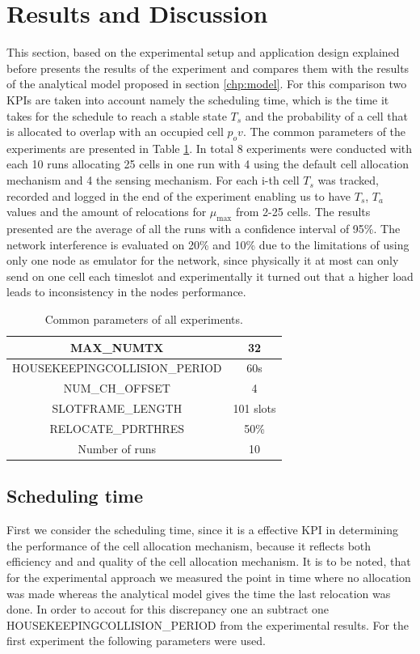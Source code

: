 \documentclass{comnets-thesis}
\begin{document}
\section{ Results and Discussion }
This section, based on the experimental setup and application design explained before presents the results of the experiment and compares them with the results of the analytical model proposed in section \ref{chp:model}. For this comparison two \acp{KPI} are taken into account namely the scheduling time, which is the time it takes for the schedule to reach a stable state $T_s$ and the probability of a cell that is allocated to overlap with an occupied cell $p_ov$. The common parameters of the experiments are presented in Table \ref{tab:common-para-ex}. In total 8 experiments were conducted with each 10 runs allocating 25 cells in one run with 4 using the default cell allocation mechanism and 4 the sensing mechanism. For each i-th cell $T_s$ was tracked, recorded and logged in the end of the experiment enabling us to have $T_s$, $T_a$ values and the amount of relocations for $\mu_{\max}$ from 2-25 cells. The results presented are the average of all the runs with a confidence interval of 95\%. 
The network interference is evaluated on 20\% and 10\% due to the limitations of using only one node as emulator for the network, since physically it at most can only send on one cell each timeslot and experimentally it turned out that a higher load leads to inconsistency in the nodes performance. 

\begin{table}[h]
    \centering
    \caption{Common parameters of all experiments.}
    \begin{tabular}{|c|c|}
    \hline
    MAX\_NUMTX & 32 \\ \hline
    HOUSEKEEPINGCOLLISION\_PERIOD & 60s  \\ \hline
    NUM\_CH\_OFFSET & 4 \\ \hline
    SLOTFRAME\_LENGTH & 101 slots  \\ \hline
    RELOCATE\_PDRTHRES & 50\%  \\ \hline
    Number of runs & 10  \\ \hline
    \end{tabular}
    \label{tab:common-para-ex}
\end{table}

\subsection*{Scheduling time}
First we consider the scheduling time, since it is a effective \ac{KPI} in determining the performance of the cell allocation mechanism, because it reflects both efficiency and and quality of the cell allocation mechanism. It is to be noted, that for the experimental approach we measured the point in time where no allocation was made whereas the analytical model gives the time the last relocation was done. In order to accout for this discrepancy one an subtract one HOUSEKEEPINGCOLLISION\_PERIOD from the experimental results. 
For the first experiment the following parameters were used.
\end{document}
